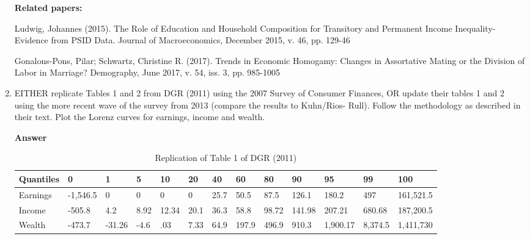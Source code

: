 \documentclass[12pt]{article}%
\begin{document}
\begin{enumerate}
\begin{itemize}
 \end{itemize}

	\textbf{Related papers:}


Ludwig, Johannes (2015). The Role of Education and Household Composition for Transitory and Permanent Income Inequality-Evidence from PSID Data. 
Journal of Macroeconomics, December 2015, v. 46, pp. 129-46

Gonalons-Pons, Pilar; Schwartz, Christine R. (2017). Trends in Economic Homogamy: Changes in Assortative Mating or the Division of Labor in Marriage?
Demography, June 2017, v. 54, iss. 3, pp. 985-1005
	
	
	\item EITHER replicate Tables 1 and 2 from DGR (2011) using the 2007 Survey of Consumer Finances, OR update their tables 1 and 2 using the more
	recent wave of the survey from 2013 (compare the results to Kuhn/Rios-	Rull). Follow the methodology as described in their text. Plot the Lorenz
	curves for earnings, income and wealth.
	
		    	\vspace{3mm}
	
	{\bf Answer}   	
	
	
	
	\begin {table}[H]
	\footnotesize
	\begin{center}
			\caption {Replication of Table 1 of DGR (2011)}
			\label{tab:Table1}
			{
				\begin{tabular}{l*{12}{l}}
					\hline
					Quantiles&  0&1&5&10&20&40&60&80&90&95&99&100\\
					\hline
					Earnings &-1,546.5 & 0&0 & 0&0&25.7&50.5&87.5& 126.1& 180.2&497&161,521.5\\
					Income   &-505.8  & 4.2 & 8.92& 12.34& 20.1&36.3& 58.8&98.72&141.98&207.21&680.68&187,200.5   \\
					Wealth   & -473.7 &-31.26 & -4.6&.03 & 7.33&64.9&197.9&496.9&910.3&1,900.17&8,374.5&   1,411,730 \\
					\hline
				\end{tabular}
			}	

	\end{center} 
	\end {table}

\normalfont


\end{enumerate}
\end{document}
